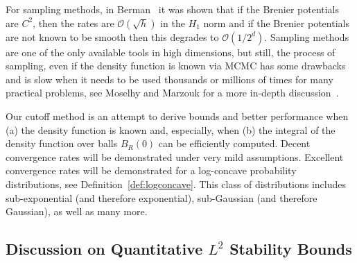 \documentclass{amsart}
\theoremstyle{lemma}
\theoremstyle{remark}
\begin{document}
For sampling methods, in Berman~\cite{berman} it was shown that if the Brenier potentials are $C^2$, then the rates are $\mathcal{O}(\sqrt{h})$ in the $H_1$ norm and if the Brenier potentials are not known to be smooth then this degrades to $\mathcal{O}(1/2^{d})$. Sampling methods are one of the only available tools in high dimensions, but still, the process of sampling, even if the density function is known via MCMC has some drawbacks and is slow when it needs to be used thousands or millions of times for many practical problems, see Moselhy and Marzouk for a more in-depth discussion~\cite{bayesianoptimalmaps}.

Our cutoff method is an attempt to derive bounds and better performance when (a) the density function is known and, especially, when (b) the integral of the density function over balls $B_{R}(0)$ can be efficiently computed. Decent convergence rates will be demonstrated under very mild assumptions. Excellent convergence rates will be demonstrated for a log-concave probability distributions, see Definition~\ref{def:logconcave}. This class of distributions includes sub-exponential (and therefore exponential), sub-Gaussian (and therefore Gaussian), as well as many more.

\subsection{Discussion on Quantitative $L^2$ Stability Bounds}
\end{document}
